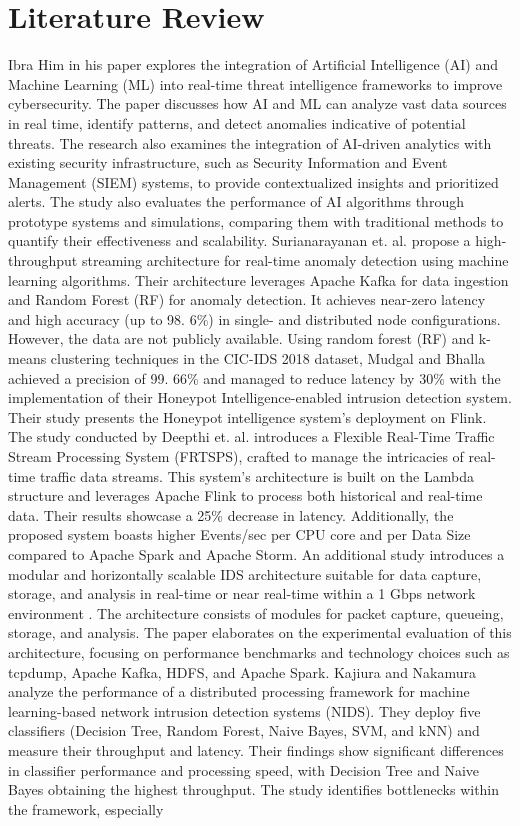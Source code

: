 \documentclass[runningheads]{llncs}
\begin{document}
\section{Literature Review}
\label{sec:Literature-Review}

Ibra Him \cite{b4} in his paper explores the integration of Artificial Intelligence (AI) and Machine Learning (ML) into real-time threat intelligence frameworks to improve cybersecurity. The paper discusses how AI and ML can analyze vast data sources in real time, identify patterns, and detect anomalies indicative of potential threats. The research also examines the integration of AI-driven analytics with existing security infrastructure, such as Security Information and Event Management (SIEM) systems, to provide contextualized insights and prioritized alerts. The study also evaluates the performance of AI algorithms through prototype systems and simulations, comparing them with traditional methods to quantify their effectiveness and scalability. Surianarayanan et. al. \cite{b2}  propose a high-throughput streaming architecture for real-time anomaly detection using machine learning algorithms. Their architecture leverages Apache Kafka for data ingestion and Random Forest (RF) for anomaly detection. It achieves near-zero latency and high accuracy (up to 98. 6\%) in single- and distributed node configurations. However, the data are not publicly available. Using random forest (RF) and k-means clustering techniques in the CIC-IDS 2018 dataset, Mudgal and Bhalla \cite{b5} achieved a precision of 99. 66\% and managed to reduce latency by 30\% with the implementation of their Honeypot Intelligence-enabled intrusion detection system. Their study presents the Honeypot intelligence system's deployment on Flink. The study conducted by Deepthi et. al. \cite{b6} introduces a Flexible Real-Time Traffic Stream Processing System (FRTSPS), crafted to manage the intricacies of real-time traffic data streams. This system's architecture is built on the Lambda structure and leverages Apache Flink to process both historical and real-time data. Their results showcase a 25\% decrease in latency. Additionally, the proposed system boasts higher Events/sec per CPU core and per Data Size compared to Apache Spark and Apache Storm. An additional study introduces a modular and horizontally scalable IDS architecture suitable for data capture, storage, and analysis in real-time or near real-time within a 1 Gbps network environment \cite{b7}. The architecture consists of modules for packet capture, queueing, storage, and analysis. The paper elaborates on the experimental evaluation of this architecture, focusing on performance benchmarks and technology choices such as tcpdump, Apache Kafka, HDFS, and Apache Spark. Kajiura and Nakamura \cite{b8} analyze the performance of a distributed processing framework for machine learning-based network intrusion detection systems (NIDS). They deploy five classifiers (Decision Tree, Random Forest, Naive Bayes, SVM, and kNN) and measure their throughput and latency. Their findings show significant differences in classifier performance and processing speed, with Decision Tree and Naive Bayes obtaining the highest throughput. The study identifies bottlenecks within the framework, especially 
\end{document}
